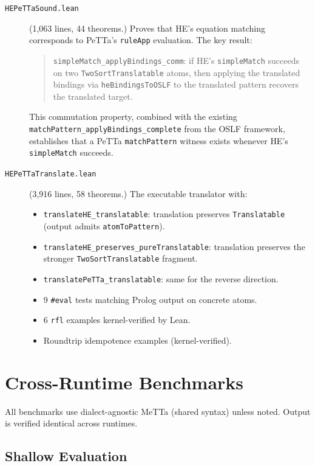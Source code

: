 \documentclass[11pt]{article}
\newcommand{\code}[1]{\texttt{#1}}
\newcommand{\PeTTa}{\textup{PeTTa}}
\newcommand{\HE}{\textup{HE}}
\begin{document}
\begin{description}
\item[\code{HEPeTTaSound.lean}] (1{,}063 lines, 44 theorems.)
  Proves that \HE{}'s equation matching corresponds to \PeTTa{}'s
  \code{ruleApp} evaluation.  The key result:
  \begin{quote}
  \code{simpleMatch\_applyBindings\_comm}: if \HE{}'s
  \code{simpleMatch} succeeds on two \code{TwoSortTranslatable} atoms,
  then applying the translated bindings via \code{heBindingsToOSLF} to
  the translated pattern recovers the translated target.
  \end{quote}
  This commutation property, combined with the existing
  \code{matchPattern\_applyBindings\_complete} from the OSLF framework,
  establishes that a \PeTTa{} \code{matchPattern} witness exists
  whenever \HE{}'s \code{simpleMatch} succeeds.

\item[\code{HEPeTTaTranslate.lean}] (3{,}916 lines, 58 theorems.)
  The executable translator with:
  \begin{itemize}
  \item \code{translateHE\_translatable}: translation preserves
    \code{Translatable} (output admits \code{atomToPattern}).
  \item \code{translateHE\_preserves\_pureTranslatable}: translation
    preserves the stronger \code{TwoSortTranslatable} fragment.
  \item \code{translatePeTTa\_translatable}: same for the reverse
    direction.
  \item 9 \code{\#eval} tests matching Prolog output on concrete atoms.
  \item 6 \code{rfl} examples kernel-verified by Lean.
  \item Roundtrip idempotence examples (kernel-verified).
  \end{itemize}
\end{description}

\section{Cross-Runtime Benchmarks}

All benchmarks use dialect-agnostic MeTTa (shared syntax) unless noted.
Output is verified identical across runtimes.

\subsection{Shallow Evaluation}
\end{document}
